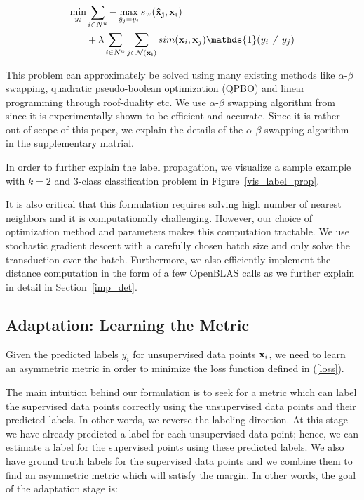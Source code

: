 \begin{equation}
\begin{aligned}
\min_{y_i}  &\sum_{i \in N^u} - \max_{\hat{y}_j=y_i}  \sw(\mathbf{\hat{x}_j},\mathbf{x}_{i}) \\
&+ \lambda
\sum_{i \in N^u} \sum_{j \in \mathcal{N}(\mathbf{x_i})} sim(\mathbf{x}_i, \mathbf{x}_j) \mathds{1}(y_i \neq y_j)
\end{aligned}
\label{robtran}
\end{equation}

This problem can approximately be solved using many existing methods like $\alpha$-$\beta$ swapping, quadratic pseudo-boolean optimization (QPBO) and linear programming through roof-duality etc. We use $\alpha$-$\beta$ swapping algorithm from \cite{kolmogrovalphabeta} since it is experimentally shown to be efficient and accurate. Since it is rather out-of-scope of this paper, we explain the details of the $\alpha$-$\beta$ swapping algorithm in the supplementary matrial.

In order to further explain the label propagation, we visualize a sample example with $k=2$ and $3$-class classification problem in Figure~\ref{vis_label_prop}. 

It is also critical that this formulation requires solving high number of nearest neighbors and it is computationally challenging. However, our choice of optimization method and parameters makes this computation tractable. We use stochastic gradient descent with a carefully chosen batch size and only solve the transduction over the batch. Furthermore, we also efficiently implement the distance computation in the form of a few OpenBLAS calls as we further explain in detail in Section~\ref{imp_det}. 


\subsection{Adaptation: Learning the Metric}
\label{metric}
Given the predicted labels $y_i$ for unsupervised data points $\mathbf{x}_i$, we need to learn an asymmetric metric in order to minimize the loss function defined in (\ref{loss}). 

The main intuition behind our formulation is to seek for a metric which can label the supervised data points correctly using the unsupervised data points and their predicted labels. In other words, we reverse the labeling direction. At this stage we have already predicted a label for each unsupervised data point; hence, we can estimate a label for the supervised points using these predicted labels. We also have ground truth labels for the supervised data points and we combine them to find an asymmetric metric which will satisfy the margin. In other words, the goal of the adaptation stage is:

